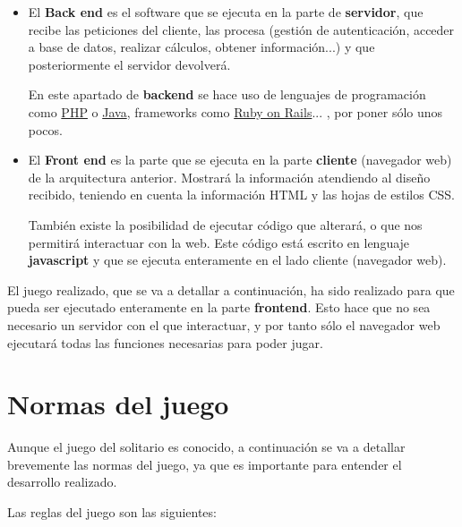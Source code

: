 \documentclass{\ClassPath/viu-tfm-template}
\begin{document}
\begin{itemize}
    \item El \textbf{Back end} es el software que se ejecuta en la parte de \textbf{servidor}, que recibe las peticiones del cliente, las procesa (gestión de autenticación, acceder a base de datos, realizar cálculos, obtener información...) y que posteriormente el servidor devolverá.

    En este apartado de \textbf{backend} se hace uso de lenguajes de programación como \href{https://www.php.net/}{PHP} o \href{https://www.java.com/es/}{Java}, frameworks como \href{https://rubyonrails.org/}{Ruby on Rails}... , por poner sólo unos pocos.

    \item El \textbf{Front end} es la parte que se ejecuta en la parte \textbf{cliente} (navegador web) de la arquitectura anterior. Mostrará la información atendiendo al diseño recibido, teniendo en cuenta la información HTML y las hojas de estilos CSS.

    También existe la posibilidad de ejecutar código que alterará, o que nos permitirá interactuar con la web. Este código está escrito en lenguaje \textbf{javascript} y que se ejecuta enteramente en el lado cliente (navegador web).
\end{itemize}

El juego realizado, que se va a detallar a continuación, ha sido realizado para que pueda ser ejecutado enteramente en la parte \textbf{frontend}. Esto hace que no sea necesario un servidor con el que interactuar, y por tanto sólo el navegador web ejecutará todas las funciones necesarias para poder jugar.


\chapter{Normas del juego}

Aunque el juego del solitario es conocido, a continuación se va a detallar brevemente las normas del juego, ya que es importante para entender el desarrollo realizado.

Las reglas del juego son las siguientes:
\end{document}
